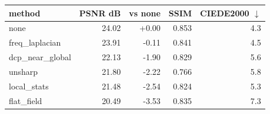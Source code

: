 \begin{tabular}{lrrrr}
\toprule
method & PSNR dB & vs none & SSIM & CIEDE2000 $\downarrow$ \\
\midrule
none & 24.02 & +0.00 & 0.853 & 4.3 \\
freq\_laplacian & 23.91 & -0.11 & 0.841 & 4.5 \\
dcp\_near\_global & 22.13 & -1.90 & 0.829 & 5.6 \\
unsharp & 21.80 & -2.22 & 0.766 & 5.8 \\
local\_stats & 21.48 & -2.54 & 0.824 & 5.3 \\
flat\_field & 20.49 & -3.53 & 0.835 & 7.3 \\
\bottomrule
\end{tabular}
